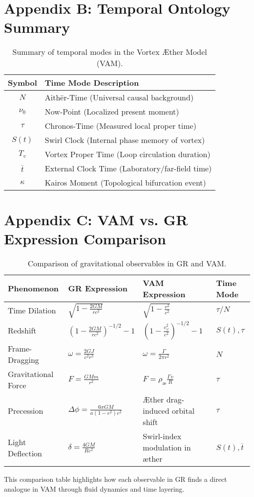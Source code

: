\documentclass[11pt]{article}
\begin{document}
    \section*{Appendix B: Temporal Ontology Summary}
    \begin{table}[H]
        \centering
        \begin{tabular}{|c|l|}
            \hline
            \textbf{Symbol} & \textbf{Time Mode Description} \\\hline
            $N$      & Aithēr-Time (Universal causal background) \\\hline
            $\nu_0$  & Now-Point (Localized present moment) \\\hline
            $\tau$   & Chronos-Time (Measured local proper time) \\\hline
            $S(t)$   & Swirl Clock (Internal phase memory of vortex) \\\hline
            $T_v$    & Vortex Proper Time (Loop circulation duration) \\\hline
            $\bar{t}$& External Clock Time (Laboratory/far-field time) \\\hline
            $\kappa$ & Kairos Moment (Topological bifurcation event) \\\hline
        \end{tabular}
        \caption{Summary of temporal modes in the Vortex Æther Model (VAM).}
    \end{table}



    \section*{Appendix C: VAM vs. GR Expression Comparison}
    \begin{table}[H]
        \centering
        \begin{tabular}{|l|l|l|l|}
            \hline
            \textbf{Phenomenon} & \textbf{GR Expression} & \textbf{VAM Expression} & \textbf{Time Mode} \\\hline
            Time Dilation       & $\sqrt{1 - \frac{2GM}{rc^2}}$ & $\sqrt{1 - \frac{v^2}{c^2}}$ & $\tau/N$ \\\hline
            Redshift            & $(1 - \frac{2GM}{rc^2})^{-1/2} - 1$ & $(1 - \frac{v_\varphi^2}{c^2})^{-1/2} - 1$ & $S(t), \tau$ \\\hline
            Frame-Dragging      & $\omega = \frac{2GJ}{c^2 r^3}$ & $\omega = \frac{\Gamma}{2\pi r^2}$ & $N$ \\\hline
            Gravitational Force & $F = \frac{GMm}{r^2}$ & $F = \rho_\text{\ae} \frac{\Gamma v}{R}$ & $\tau$ \\\hline
            Precession          & $\Delta \phi = \frac{6\pi GM}{a(1 - e^2)c^2}$ & Æther drag-induced orbital shift & $\tau$ \\\hline
            Light Deflection    & $\delta = \frac{4GM}{Rc^2}$ & Swirl-index modulation in æther & $S(t), \bar{t}$ \\\hline
        \end{tabular}
        \caption{Comparison of gravitational observables in GR and VAM.}
    \end{table}


    This comparison table highlights how each observable in GR finds a direct analogue in VAM through fluid dynamics and time layering.

    
    
\end{document}
